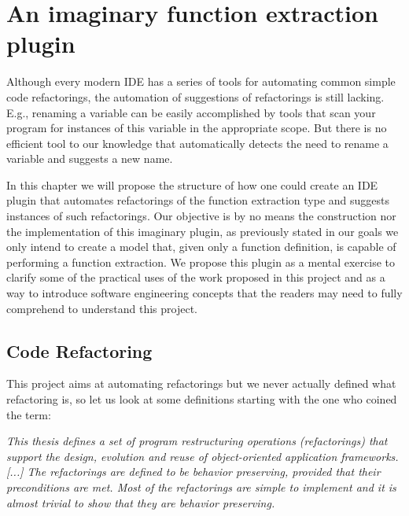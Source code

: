 
\chapter{An imaginary function extraction plugin}

Although every modern IDE has a series of tools for automating common simple code refactorings, the automation of suggestions of refactorings is still lacking. E.g., renaming a variable can be easily accomplished by tools that scan your program for instances of this variable in the appropriate scope. But there is no efficient tool to our knowledge that automatically detects the need to rename a variable and suggests a new name.

In this chapter we will propose the structure of how one could create an IDE plugin that automates refactorings of the function extraction type and suggests instances of such refactorings. Our objective is by no means the construction nor the implementation of this imaginary plugin, as previously stated in our goals we only intend to create a model that, given only a function definition, is capable of performing a function extraction. We propose this plugin as a mental exercise to clarify some of the practical uses of the work proposed in this project and as a way to introduce software engineering concepts that the readers may need to fully comprehend to understand this project.






\section{Code Refactoring}

This project aims at automating refactorings but we never actually defined what refactoring is, so let us look at some definitions starting with the one who coined the term:

\begin{myquote}
    
\textit{This thesis defines a set of program restructuring operations (refactorings) that support the design, evolution and reuse of object-oriented application frameworks. [...] The refactorings are defined to be behavior preserving, provided that their preconditions are met. Most of the refactorings are simple to implement and it is almost trivial to show that they are behavior preserving.}\\ \citet{opdyke1992refactoring}
\end{myquote}

